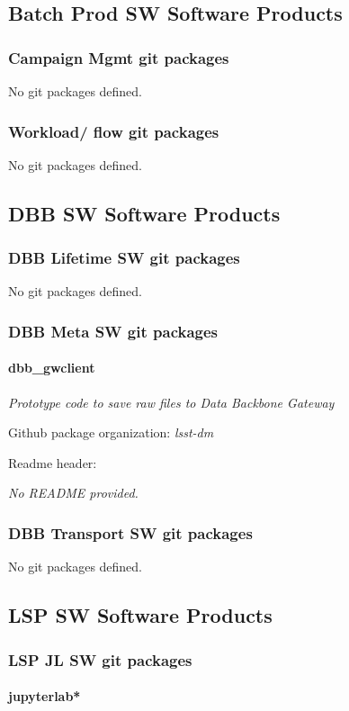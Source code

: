 \subsection{Batch Prod SW Software Products}
\subsubsection{Campaign Mgmt git packages}
No git packages defined.\subsubsection{Workload/ flow git packages}
No git packages defined.\subsection{DBB SW Software Products}
\subsubsection{DBB Lifetime SW git packages}
No git packages defined.\subsubsection{DBB Meta SW git packages}
\paragraph{dbb\_gwclient}
\textit{Prototype code to save raw files to Data Backbone Gateway}

Github package organization: \textit{lsst-dm}

Readme header:

\textit{No README provided.}

\subsubsection{DBB Transport SW git packages}
No git packages defined.\subsection{LSP SW Software Products}
\subsubsection{LSP JL SW git packages}
\paragraph{jupyterlab*}
\textit{}

